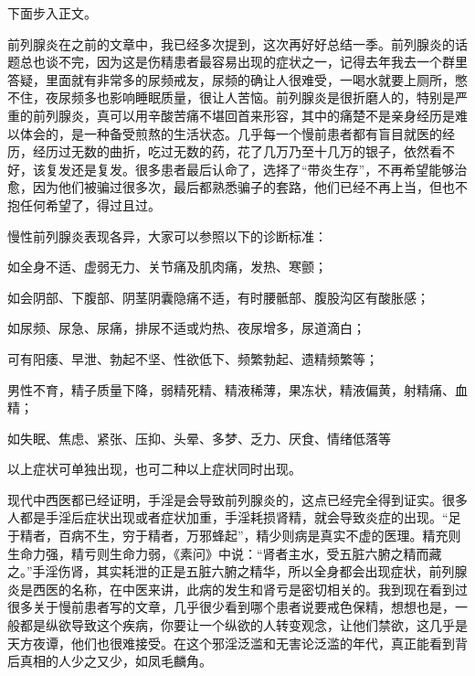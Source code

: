 \documentclass{ctexart}
\begin{document}
下面步入正文。

前列腺炎在之前的文章中，我已经多次提到，这次再好好总结一季。前列腺炎的话题总也谈不完，因为这是伤精患者最容易出现的症状之一，记得去年我去一个群里答疑，里面就有非常多的尿频戒友，尿频的确让人很难受，一喝水就要上厕所，憋不住，夜尿频多也影响睡眠质量，很让人苦恼。前列腺炎是很折磨人的，特别是严重的前列腺炎，真可以用辛酸苦痛不堪回首来形容，其中的痛楚不是亲身经历是难以体会的，是一种备受煎熬的生活状态。几乎每一个慢前患者都有盲目就医的经历，经历过无数的曲折，吃过无数的药，花了几万乃至十几万的银子，依然看不好，该复发还是复发。很多患者最后认命了，选择了“带炎生存”，不再希望能够治愈，因为他们被骗过很多次，最后都熟悉骗子的套路，他们已经不再上当，但也不抱任何希望了，得过且过。

慢性前列腺炎表现各异，大家可以参照以下的诊断标准：

\begin{description}
    \item[全身症状] 如全身不适、虚弱无力、关节痛及肌肉痛，发热、寒颤；
    \item[疼痛症状] 如会阴部、下腹部、阴茎阴囊隐痛不适，有时腰骶部、腹股沟区有酸胀感；
    \item[排尿改变及尿道分泌物] 如尿频、尿急、尿痛，排尿不适或灼热、夜尿增多，尿道滴白；
    \item[性功能症状] 可有阳痿、早泄、勃起不坚、性欲低下、频繁勃起、遗精频繁等；
    \item 男性不育，精子质量下降，弱精死精、精液稀薄，果冻状，精液偏黄，射精痛、血精；
    \item[神经症状] 如失眠、焦虑、紧张、压抑、头晕、多梦、乏力、厌食、情绪低落等
    \item 以上症状可单独出现，也可二种以上症状同时出现。
\end{description}

现代中西医都已经证明，手淫是会导致前列腺炎的，这点已经完全得到证实。很多人都是手淫后症状出现或者症状加重，手淫耗损肾精，就会导致炎症的出现。“足于精者，百病不生，穷于精者，万邪蜂起”，精少则病是真实不虚的医理。精充则生命力强，精亏则生命力弱，《素问》中说：“肾者主水，受五脏六腑之精而藏之。”手淫伤肾，其实耗泄的正是五脏六腑之精华，所以全身都会出现症状，前列腺炎是西医的名称，在中医来讲，此病的发生和肾亏是密切相关的。我到现在看到过很多关于慢前患者写的文章，几乎很少看到哪个患者说要戒色保精，想想也是，一般都是纵欲导致这个疾病，你要让一个纵欲的人转变观念，让他们禁欲，这几乎是天方夜谭，他们也很难接受。在这个邪淫泛滥和无害论泛滥的年代，真正能看到背后真相的人少之又少，如凤毛麟角。
\end{document}
